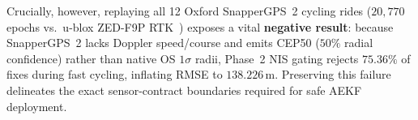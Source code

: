Crucially, however, replaying all 12 Oxford SnapperGPS~2 cycling rides ($20{,}770$ epochs vs.\ u-blox ZED-F9P RTK~\cite{beuchert2023snappergps}) exposes a vital \textbf{negative result}: because SnapperGPS~2 lacks Doppler speed/course and emits CEP50 ($50\%$ radial confidence) rather than native OS $1\sigma$ radii, Phase~2 NIS gating rejects $75.36\%$ of fixes during fast cycling, inflating RMSE to $138.226$\,m. Preserving this failure delineates the exact sensor-contract boundaries required for safe AEKF deployment.

\begin{table}[htbp]
\centering
\caption{Head-to-Head Estimator Replay on TU Wien ($3{,}286$ Matched Epochs, $\sigma_{\text{acc}}=\max(2.5, \text{HDOP}\cdot 4)$).}
\label{tab:fixed_alpha_vs_ekf_benchmark}
\end{table}


